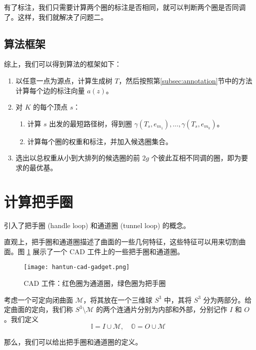 有了标注，我们只需要计算两个圈的标注是否相同，就可以判断两个圈是否同调了。这样，我们就解决了问题二。

\subsection{算法框架}

综上，我们可以得到算法的框架如下：

\begin{enumerate}
    \item 以任意一点为源点，计算生成树 $ T $，然后按照第\ref{subsec:annotation}节中的方法计算每个边的标注向量 $ a(z) $。
    \item 对 $ K $ 的每个顶点 $ s $：
    \begin{enumerate}
        \item 计算 $ s $ 出发的最短路径树，得到圈 $ \gamma(T_s, e_{m_1}), \dots, \gamma(T_s, e_{m_k}) $。
        \item 计算每个圈的权重和标注，并加入候选圈集合。
    \end{enumerate}
    \item 选出以总权重从小到大排列的候选圈的前 $ 2g $ 个彼此互相不同调的圈，即为要求的最优基。
\end{enumerate}

\section{计算把手圈}

\citet{oncomputinghantun} 引入了把手圈 (handle loop) 和通道圈 (tunnel loop) 的概念。

直观上，把手圈和通道圈描述了曲面的一些几何特征，这些特征可以用来切割曲面。图 \ref{fig:hantuncadgadget} 展示了一个 CAD 工件上的一些把手圈和通道圈。

\begin{figure}[h]
    \centering
    \texttt{[image: hantun-cad-gadget.png]}
    \caption{CAD 工件：红色圈为通道圈，绿色圈为把手圈}
    \label{fig:hantuncadgadget}
\end{figure}

考虑一个可定向闭曲面 $ \mathcal{M} $，将其放在一个三维球 $ S^3 $ 中，其将 $ S^3 $ 分为两部分。给定曲面的定向，我们称 $ S^3 \setminus \mathcal{M} $ 的两个连通片分别为内部和外部，分别记作 $ I $ 和 $ O $。我们定义
$$
\mathbb{I} = I \cup \mathcal{M}, \quad \mathbb{O} = O \cup \mathcal{M}
$$

那么，我们可以给出把手圈和通道圈的定义。

